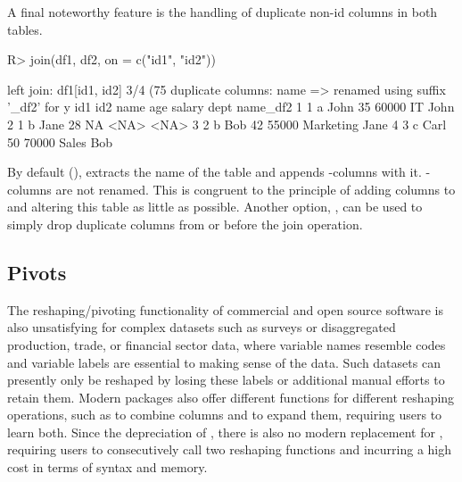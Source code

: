 \documentclass[article]{jss}
\newcommand{\fct}[1]{\code{#1()}}
\begin{document}
%
A final noteworthy feature is the handling of duplicate non-id columns in both tables.
%
\begin{Schunk}
\begin{Sinput}
R> join(df1, df2, on = c("id1", "id2"))
\end{Sinput}
\begin{Soutput}
left join: df1[id1, id2] 3/4 (75%) <m:m> df2[id1, id2] 3/4 (75%)
duplicate columns: name => renamed using suffix '_df2' for y
  id1 id2 name age salary      dept name_df2
1   1   a John  35  60000        IT     John
2   1   b Jane  28     NA      <NA>     <NA>
3   2   b  Bob  42  55000 Marketing     Jane
4   3   c Carl  50  70000     Sales      Bob
\end{Soutput}
\end{Schunk}
%
By default (), \fct{join} extracts the name of the  table and appends -columns with it. -columns are not renamed. This is congruent to the principle of adding columns to  and altering this table as little as possible. Another option, , can be used to simply drop duplicate columns from  or  before the join operation.
%
\subsection{Pivots}
%
The reshaping/pivoting functionality of commercial and open source software is also unsatisfying for complex datasets such as surveys or disaggregated production, trade, or financial sector data, where variable names resemble codes and variable labels are essential to making sense of the data. Such datasets can presently only be reshaped by losing these labels or additional manual efforts to retain them. Modern  packages also offer different functions for different reshaping operations, such as  to combine columns and  to expand them, requiring users to learn both. Since the depreciation of  \citep{rreshape2}, there is also no modern replacement for , requiring  users to consecutively call two reshaping functions and incurring a high cost in terms of syntax and memory. \newline
\end{document}
